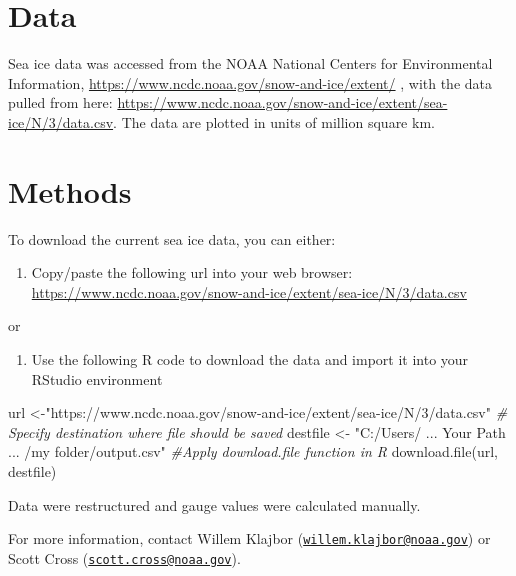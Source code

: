 \documentclass[
]{book}
\newenvironment{Shaded}{\begin{snugshade}}{\end{snugshade}}
\newcommand{\CommentTok}[1]{\textcolor[rgb]{0.56,0.35,0.01}{\textit{#1}}}
\newcommand{\FunctionTok}[1]{\textcolor[rgb]{0.00,0.00,0.00}{#1}}
\newcommand{\NormalTok}[1]{#1}
\newcommand{\OtherTok}[1]{\textcolor[rgb]{0.56,0.35,0.01}{#1}}
\newcommand{\StringTok}[1]{\textcolor[rgb]{0.31,0.60,0.02}{#1}}
\providecommand{\tightlist}{%
  \setlength{\itemsep}{0pt}\setlength{\parskip}{0pt}}
\begin{document}
\hypertarget{data-10}{%
\section{Data}\label{data-10}}

Sea ice data was accessed from the NOAA National Centers for Environmental Information, \url{https://www.ncdc.noaa.gov/snow-and-ice/extent/} , with the data pulled from here: \url{https://www.ncdc.noaa.gov/snow-and-ice/extent/sea-ice/N/3/data.csv}. The data are plotted in units of million square km.

\hypertarget{methods-10}{%
\section{Methods}\label{methods-10}}

To download the current sea ice data, you can either:

\begin{enumerate}
\def\labelenumi{\arabic{enumi})}
\tightlist
\item
  Copy/paste the following url into your web browser:
  \url{https://www.ncdc.noaa.gov/snow-and-ice/extent/sea-ice/N/3/data.csv}
\end{enumerate}

or

\begin{enumerate}
\def\labelenumi{\arabic{enumi})}
\setcounter{enumi}{1}
\tightlist
\item
  Use the following R code to download the data and import it into your RStudio environment
\end{enumerate}

\begin{Shaded}
\begin{Highlighting}[]
\NormalTok{url }\OtherTok{\textless{}{-}}\StringTok{"https://www.ncdc.noaa.gov/snow{-}and{-}ice/extent/sea{-}ice/N/3/data.csv"}
\CommentTok{\# Specify destination where file should be saved}
\NormalTok{destfile }\OtherTok{\textless{}{-}} \StringTok{"C:/Users/ ... Your Path ... /my folder/output.csv"}
\CommentTok{\#Apply download.file function in R}
\FunctionTok{download.file}\NormalTok{(url, destfile)}
\end{Highlighting}
\end{Shaded}

Data were restructured and gauge values were calculated manually.

For more information, contact Willem Klajbor (\href{mailto:willem.klajbor@noaa.gov}{\nolinkurl{willem.klajbor@noaa.gov}}) or Scott Cross (\href{mailto:scott.cross@noaa.gov}{\nolinkurl{scott.cross@noaa.gov}}).
\end{document}
